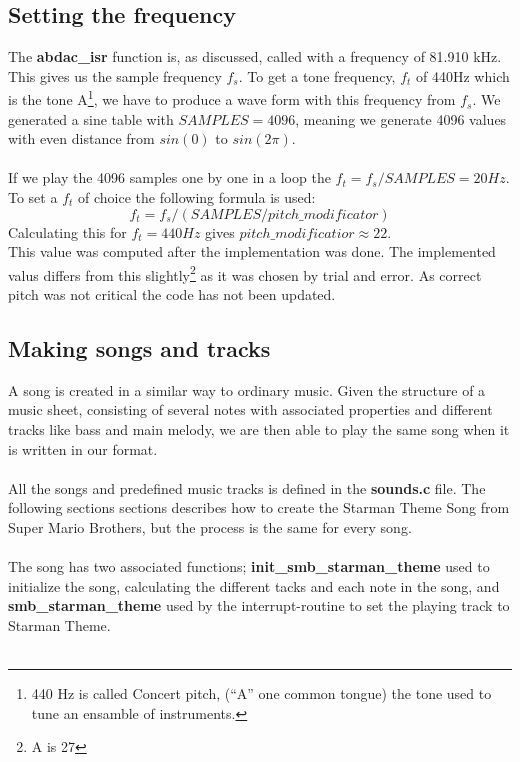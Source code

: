 \subsection{Setting the frequency}
The \textbf{abdac\_isr} function is, as discussed, called with a frequency of 81.910 kHz. This gives us the sample frequency $ f_s $. To
get a tone frequency, $f_t$ of 440Hz which is the tone A\footnote{440 Hz is called Concert pitch, (``A'' one common tongue) the tone used to tune an ensamble of instruments.},
we have to produce a wave form with this frequency from $f_s$. We generated a sine table with $SAMPLES = 4096$, meaning we
generate 4096 values with even distance from $sin(0)$ to $sin(2\pi)$.\\
\\
If we play the 4096 samples one by one in a loop the $f_t = f_s / SAMPLES = 20Hz$. To set a $f_t$ of choice the following formula
is used:
$$f_t = f_s / (SAMPLES / pitch\_modificator) $$
Calculating this for $f_t = 440 Hz$ gives $pitch\_modificatior \approx 22$. \\
This value was computed after the implementation was done. The implemented valus differs from this slightly\footnote{A is 27} as
it was chosen by trial and error. As correct pitch was not critical the code has not been updated.


\subsection{Making songs and tracks}
A song is created in a similar way to ordinary music.
Given the structure of a music sheet, consisting of several notes with associated
properties and different tracks like bass and main melody,
we are then able to play the same song when it is written in our format. \\
\\
All the songs and predefined music tracks is defined in the \textbf{sounds.c} file.
The following sections sections describes how to create the
Starman Theme Song\cite{smb-starman-theme} from Super Mario Brothers, but the process is the same
for every song.\\
\\
The song has two associated functions; \textbf{init\_smb\_starman\_theme} used to initialize
the song, calculating the different tacks and each note in the song,
and \textbf{smb\_starman\_theme} used by the interrupt-routine to set the playing track
to Starman Theme.\\
\\
